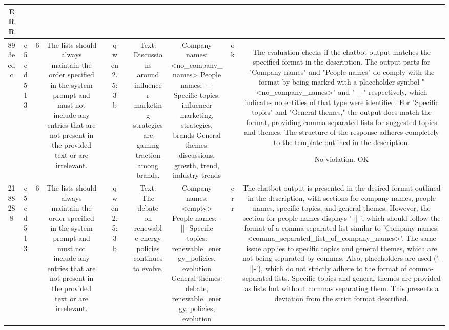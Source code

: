 \begin{table}[h!]
\begin{tabular}{|c|c|c|c|c|c|c|c|c|c|c|}
ERR\\
\hline
893eedc & e5ed513 & 6 & The lists should always maintain the order specified in the system prompt and must not include any entries that are not present in the provided text or are irrelevant. &  & qwen2.5:3b &  & Text: Discussions around influencer marketing strategies are gaining traction among brands. & Company names: <no_company_names>
People names: -||-
Specific topics: influencer marketing, strategies, brands
General themes: discussions, growth, trend, industry trends & ok & The evaluation checks if the chatbot output matches the specified format in the description. The output parts for "Company names" and "People names" do comply with the format by being marked with a placeholder symbol "<no_company_names>" and "-||-" respectively, which indicates no entities of that type were identified. For "Specific topics" and "General themes," the output does match the format, providing comma-separated lists for suggested topics and themes. The structure of the response adheres completely to the template outlined in the description.

No violation.
OK\\
\hline
2188288 & e5ed513 & 6 & The lists should always maintain the order specified in the system prompt and must not include any entries that are not present in the provided text or are irrelevant. &  & qwen2.5:3b &  & Text: The debate on renewable energy policies continues to evolve. & Company names: <empty>
People names: -||-
Specific topics: renewable_energy_policies, evolution
General themes: debate, renewable_energy, policies, evolution & err & The chatbot output is presented in the desired format outlined in the description, with sections for company names, people names, specific topics, and general themes. However, the section for people names displays '-||-', which should follow the format of a comma-separated list similar to 'Company names: <comma_separated_list_of_company_names>'. The same issue applies to specific topics and general themes, which are not being separated by commas. Also, placeholders are used ('-||-'), which do not strictly adhere to the format of comma-separated lists. Specific topics and general themes are provided as lists but without commas separating them. This presents a deviation from the strict format described.


\end{tabular}
\end{table}
